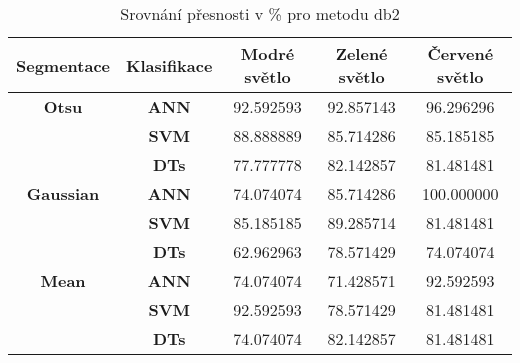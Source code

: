\capstartfalse
\begin{table}[!htbp]
\centering
\begin{tabular}{|c|c|c|c|c|}
\hline
\textbf{Segmentace} & \textbf{Klasifikace} & \textbf{Modré světlo} & \textbf{Zelené světlo} & \textbf{Červené světlo} \\ \hline
\textbf{Otsu}       & \textbf{ANN}         & 92.592593             & 92.857143              & 96.296296               \\ \hline
\textbf{}           & \textbf{SVM}         & 88.888889             & 85.714286              & 85.185185               \\ \hline
\textbf{}           & \textbf{DTs}         & 77.777778             & 82.142857              & 81.481481               \\ \hline
\textbf{Gaussian}   & \textbf{ANN}         & 74.074074             & 85.714286              & 100.000000              \\ \hline
\textbf{}           & \textbf{SVM}         & 85.185185             & 89.285714              & 81.481481               \\ \hline
\textbf{}           & \textbf{DTs}         & 62.962963             & 78.571429              & 74.074074               \\ \hline
\textbf{Mean}       & \textbf{ANN}         & 74.074074             & 71.428571              & 92.592593               \\ \hline
\textbf{}           & \textbf{SVM}         & 92.592593             & 78.571429              & 81.481481               \\ \hline
\textbf{}           & \textbf{DTs}         & 74.074074             & 82.142857              & 81.481481               \\ \hline
\end{tabular}
\caption{Srovnání přesnosti v \% pro metodu db2 }
\end{table}
\capstarttrue

